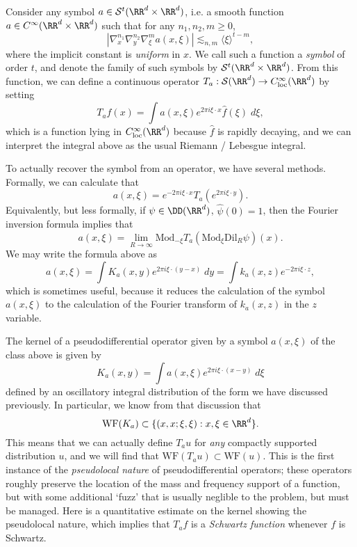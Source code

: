 Consider any symbol $a \in \mathcal{S}^t(\RR^d \times \RR^d)$, i.e. a smooth function $a \in C^\infty(\RR^d \times \RR^d)$ such that for any $n_1,n_2,m \geq 0$,
%
\[ |\nabla_x^{n_1} \nabla_y^{n_2} \nabla_\xi^m a(x,\xi)| \lesssim_{n,m} \langle \xi \rangle^{t - m}, \]
%
where the implicit constant is \emph{uniform} in $x$. We call such a function a \emph{symbol} of order $t$, and denote the family of such symbols by $\mathcal{S}^t(\RR^d \times \RR^d)$. From this function, we can define a continuous operator $T_a: \mathcal{S}(\RR^d) \to C^\infty_{\text{loc}}(\RR^d)$ by setting
%
\[ T_a f(x) = \int a(x,\xi) e^{2 \pi i \xi \cdot x} \widehat{f}(\xi)\; d\xi, \]
%
which is a function lying in $C^\infty_{\text{loc}}(\RR^d)$ because $\widehat{f}$ is rapidly decaying, and we can interpret the integral above as the usual Riemann / Lebesgue integral.

To actually recover the symbol from an operator, we have several methods. Formally, we can calculate that
%
\[ a(x,\xi) = e^{-2 \pi i \xi \cdot x} T_a(e^{2 \pi i \xi \cdot y}). \]
%
Equivalently, but less formally, if $\psi \in \DD(\RR^d)$, $\widehat{\psi}(0) = 1$, then the Fourier inversion formula implies that
%
\[ a(x,\xi) = \lim_{R \to \infty} \text{Mod}_{-\xi} T_a(\text{Mod}_{\xi} \text{Dil}_R \psi) (x). \]
%
We may write the formula above as
%
\[ a(x,\xi) = \int K_a(x,y) e^{2 \pi i \xi \cdot (y-x)}\; dy = \int k_a(x,z) e^{-2 \pi i \xi \cdot z}, \]
%
which is sometimes useful, because it reduces the calculation of the symbol $a(x,\xi)$ to the calculation of the Fourier transform of $k_a(x,z)$ in the $z$ variable.

The kernel of a pseudodifferential operator given by a symbol $a(x,\xi)$ of the class above is given by
%
\[ K_a(x,y) = \int a(x,\xi) e^{2 \pi i \xi \cdot (x - y)}\; d\xi \]
%
defined by an oscillatory integral distribution of the form we have discussed previously. In particular, we know from that discussion that
%
\[ \text{WF}(K_a) \subset \{ (x,x;\xi,\xi) : x, \xi \in \RR^d \}. \]
%
This means that we can actually define $T_a u$ for \emph{any} compactly supported distribution $u$, and we will find that $\text{WF}(T_a u) \subset \text{WF}(u)$. This is the first instance of the \emph{pseudolocal nature} of pseudodifferential operators; these operators roughly preserve the location of the mass and frequency support of a function, but with some additional `fuzz' that is usually neglible to the problem, but must be managed. Here is a quantitative estimate on the kernel showing the pseudolocal nature, which implies that $T_a f$ is a \emph{Schwartz function} whenever $f$ is Schwartz.

